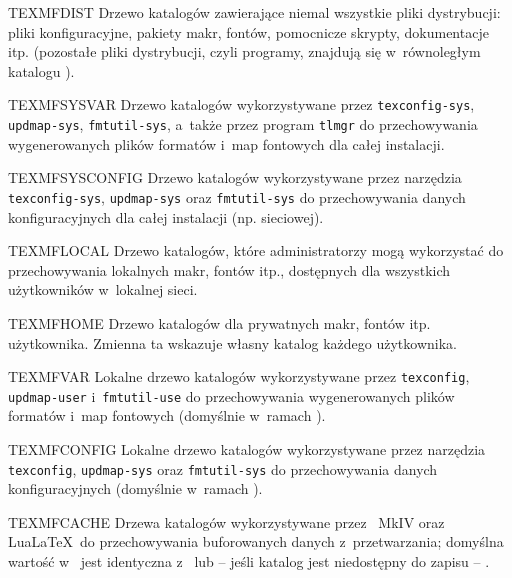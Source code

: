 \documentclass{article}
\begin{document}
\begin{ttdescription}
\item [TEXMFDIST] Drzewo katalogów zawierające niemal wszystkie pliki
 dystrybucji: pliki konfiguracyjne, pakiety makr, fontów, pomocnicze skrypty, dokumentacje itp.
 (pozostałe pliki dystrybucji, czyli programy, znajdują się w~równoległym
 katalogu ).
 \item [TEXMFSYSVAR] Drzewo katalogów wykorzystywane przez
 \verb+texconfig-sys+, \verb+updmap-sys+, \verb+fmtutil-sys+, a~także
 przez program \verb+tlmgr+ do przechowywania wygenerowanych plików
 formatów i~map fontowych dla całej instalacji.
 \item [TEXMFSYSCONFIG] Drzewo katalogów wykorzystywane przez narzędzia
 \verb+texconfig-sys+, \verb+updmap-sys+ oraz \verb+fmtutil-sys+
 do przechowywania danych konfiguracyjnych dla całej instalacji (np.
 sieciowej).
 \item [TEXMFLOCAL] Drzewo katalogów, które administratorzy mogą wykorzystać
 do przechowywania lokalnych makr, fontów itp., dostępnych dla wszystkich
 użytkowników w~lokalnej sieci.
\item [TEXMFHOME] Drzewo katalogów dla prywatnych makr, fontów itp.
 użytkownika. %
 Zmienna ta wskazuje  własny katalog każdego użytkownika.
\item [TEXMFVAR] Lokalne drzewo katalogów wykorzystywane przez \verb+texconfig+,
 \verb+updmap-user+ i~\verb+fmtutil-use+ do przechowywania wygenerowanych plików
 formatów i~map fontowych (domyślnie w~ramach ).
\item [TEXMFCONFIG] Lokalne drzewo katalogów wykorzystywane przez narzędzia
 \verb+texconfig+, \verb+updmap-sys+ oraz \verb+fmtutil-sys+ do przechowywania
 danych konfiguracyjnych (domyślnie w~ramach ).
\item [TEXMFCACHE] Drzewa katalogów wykorzystywane przez \ConTeXt\
  MkIV oraz Lua\LaTeX\ do przechowywania buforowanych danych
  z~przetwarzania; domyślna wartość w~\TL{} jest identyczna
  z~ lub -- jeśli katalog jest niedostępny do zapisu
  -- \code{TEXMFVAR}.
\end{ttdescription}
\end{document}
